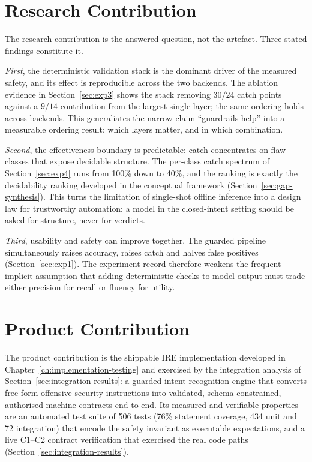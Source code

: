 \section{Research Contribution}\label{sec:discussion-research}

The research contribution is the answered question, not the artefact. Three
stated findings constitute it.

\emph{First}, the deterministic validation stack is the dominant driver of the
measured safety, and its effect is reproducible across the two backends. The
ablation evidence in Section~\ref{sec:exp3} shows the stack removing
$30/24$ catch points against a $9/14$ contribution from the largest single
layer; the same ordering holds across backends. This generaliates the narrow
claim ``guardrails help'' into a measurable ordering result: which layers
matter, and in which combination.

\emph{Second}, the effectiveness boundary is predictable: catch concentrates
on flaw classes that expose decidable structure. The per-class catch spectrum
of Section~\ref{sec:exp4} runs from 100\% down to 40\%, and the ranking is
exactly the decidability ranking developed in the conceptual framework
(Section~\ref{sec:gap-synthesis}). This turns the limitation of single-shot
offline inference into a design law for trustworthy automation: a model in the
closed-intent setting should be asked for structure, never for verdicts.

\emph{Third}, usability and safety can improve together. The guarded pipeline
simultaneously raises accuracy, raises catch and halves false positives
(Section~\ref{sec:exp1}). The experiment record therefore weakens the frequent
implicit assumption that adding deterministic checks to model output must trade
either precision for recall or fluency for utility.

\section{Product Contribution}\label{sec:discussion-product}

The product contribution is the shippable IRE implementation developed in
Chapter~\ref{ch:implementation-testing} and exercised by the integration
analysis of Section~\ref{sec:integration-results}: a guarded intent-recognition
engine that converts free-form offensive-security instructions into validated,
schema-constrained, authorised machine contracts end-to-end. Its measured and
verifiable properties are an automated test suite of 506 tests (76\%
statement coverage, 434 unit and 72 integration) that encode the safety
invariant as executable expectations, and a live C1--C2 contract verification
that exercised the real code paths (Section~\ref{sec:integration-results}).


